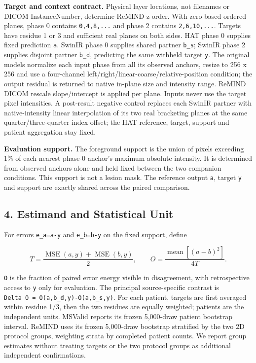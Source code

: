 \documentclass[
]{article}
\begin{document}
\textbf{Target and context contract.} Physical layer locations, not
filenames or DICOM InstanceNumber, determine ReMIND z order. With
zero-based ordered planes, phase 0 contains \texttt{0,4,8,...} and phase
2 contains \texttt{2,6,10,...}. Targets have residue 1 or 3 and
sufficient real planes on both sides. HAT phase 0 supplies fixed
prediction \texttt{a}. SwinIR phase 0 supplies shared partner
\texttt{b\_s}; SwinIR phase 2 supplies disjoint partner \texttt{b\_d},
predicting the same withheld target \texttt{y}. The original models
normalize each input phase from all its observed anchors, resize to 256
x 256 and use a four-channel left/right/linear-coarse/relative-position
condition; the output residual is returned to native in-plane size and
intensity range. ReMIND DICOM rescale slope/intercept is applied per
plane. Inputs never use the target pixel intensities. A post-result
negative control replaces each SwinIR partner with native-intensity
linear interpolation of its two real bracketing planes at the same
quarter/three-quarter index offset; the HAT reference, target, support
and patient aggregation stay fixed.

\textbf{Evaluation support.} The foreground support is the union of
pixels exceeding 1\% of each nearest phase-0 anchor's maximum absolute
intensity. It is determined from observed anchors alone and held fixed
between the two companion conditions. This support is not a lesion mask.
The reference output \texttt{a}, target \texttt{y} and support are
exactly shared across the paired comparison.

\subsection{4. Estimand and Statistical
Unit}\label{estimand-and-statistical-unit}

For errors \texttt{e\_a=a-y} and \texttt{e\_b=b-y} on the fixed support,
define

\[
T=\frac{\operatorname{MSE}(a,y)+\operatorname{MSE}(b,y)}{2},\qquad
O=\frac{\operatorname{mean}[(a-b)^2]}{4T}.
\]

\texttt{O} is the fraction of paired error energy visible in
disagreement, with retrospective access to \texttt{y} only for
evaluation. The principal source-specific contrast is
\texttt{Delta\ O\ =\ O(a,b\_d,y)-O(a,b\_s,y)}. For each patient, targets
are first averaged within residue 1/3, then the two residues are equally
weighted; patients are the independent units. MSValid reports its frozen
5,000-draw patient bootstrap interval. ReMIND uses its frozen 5,000-draw
bootstrap stratified by the two 2D protocol groups, weighting strata by
completed patient counts. We report group estimates without treating
targets or the two protocol groups as additional independent
confirmations.
\end{document}
